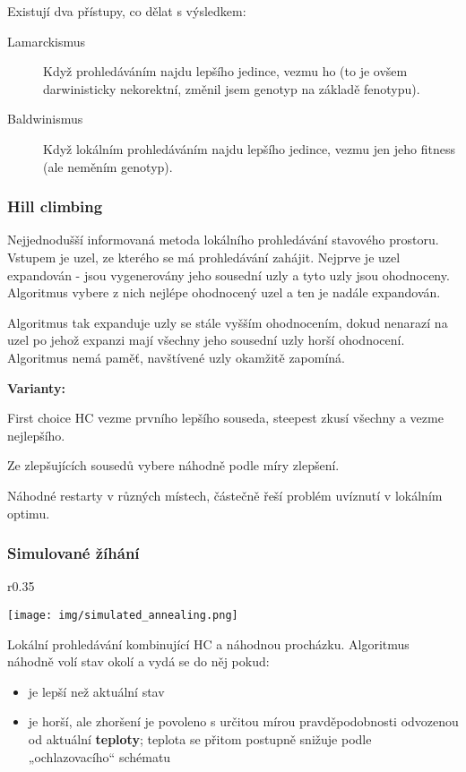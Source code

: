 Existují dva přístupy, co dělat s výsledkem:
\begin{description}
	\item[Lamarckismus] Když prohledáváním najdu lepšího jedince, vezmu ho (to je ovšem darwinisticky nekorektní, změnil jsem genotyp na základě fenotypu).
	\item[Baldwinismus] Když lokálním prohledáváním najdu lepšího jedince, vezmu jen jeho fitness (ale neměním genotyp).
\end{description}


\subsubsection{Hill climbing}
Nejjednodušší informovaná metoda lokálního prohledávání stavového prostoru. Vstupem je uzel, ze kterého se má prohledávání zahájit. Nejprve je uzel expandován - jsou vygenerovány jeho sousední uzly a tyto uzly jsou ohodnoceny. Algoritmus vybere z nich nejlépe ohodnocený uzel a ten je nadále expandován. 

Algoritmus tak expanduje uzly se stále vyšším ohodnocením, dokud nenarazí na uzel po jehož expanzi mají všechny jeho sousední uzly horší ohodnocení. Algoritmus nemá paměť, navštívené uzly okamžitě zapomíná.

\medskip\textbf{Varianty:}
\begin{description}
	\leftskip 30pt
	
	\item[first choice HC vs. steepest ascent HC] First choice HC vezme prvního lepšího souseda, steepest zkusí všechny a vezme nejlepšího.
	\item[stochastic HC] Ze zlepšujících sousedů vybere náhodně podle míry zlepšení.
	\item[random restart HC (or shotgun HC)] Náhodné restarty v různých místech, částečně řeší problém uvíznutí v lokálním optimu.
\end{description}


\subsubsection{Simulované žíhání}
	\setlength\intextsep{0pt}
\begin{wrapfigure}{r}{0.35\textwidth}
	\centering

	\texttt{[image: img/simulated\_annealing.png]}
\end{wrapfigure}
Lokální prohledávání kombinující HC a náhodnou procházku. Algoritmus náhodně volí stav okolí a vydá se do něj pokud:
\begin{itemize}
	
	
	\item je lepší než aktuální stav
	\item je horší, ale zhoršení je povoleno s určitou mírou pravděpodobnosti odvozenou od aktuální \textbf{teploty}; teplota se přitom postupně snižuje podle „ochlazovacího“ schématu
\end{itemize}


